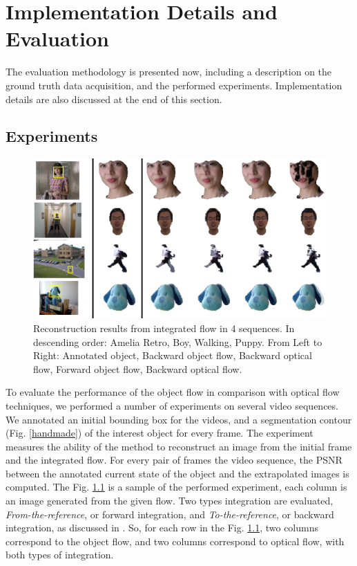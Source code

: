 \chapter{Implementation Details and Evaluation} \label{chap:results}

The evaluation methodology is presented now, including a description on the ground truth data 
acquisition, and the performed experiments. Implementation details are also discussed at the end of 
this section. 


\section{Experiments}

   \begin{figure}[th]
      \centering
      \includegraphics[width=1.0\textwidth]{../images/extrapolated.png}
      \caption{Reconstruction results from integrated flow in 4 sequences. In descending order: Amelia Retro, Boy, Walking, Puppy. From Left to Right: Annotated object, Backward object flow, Backward optical flow, Forward object flow, Backward optical flow.}
      \label{sample}
   \end{figure}

To evaluate the performance of the object flow in comparison with optical flow techniques, we performed 
a number of experiments on several video sequences. We annotated an initial bounding box for the videos, 
and a segmentation contour (Fig. \ref{handmade}) of the interest object for every frame. The experiment measures the ability of the method to 
reconstruct an image from the initial frame and the integrated flow. For every pair of frames the video sequence, the PSNR between the annotated
current state of the object and the extrapolated images is computed. The Fig. \ref{sample} is a sample of the performed experiment, each column is an image generated from the given flow. 
Two types integration are evaluated, {\it From-the-reference}, or forward integration, and {\it To-the-reference}, or backward integration, as discussed in \cite{c20}. So, for each row in the Fig. \ref{sample}, two columns correspond to the object flow, and two columns correspond to optical flow, with both types of integration.

